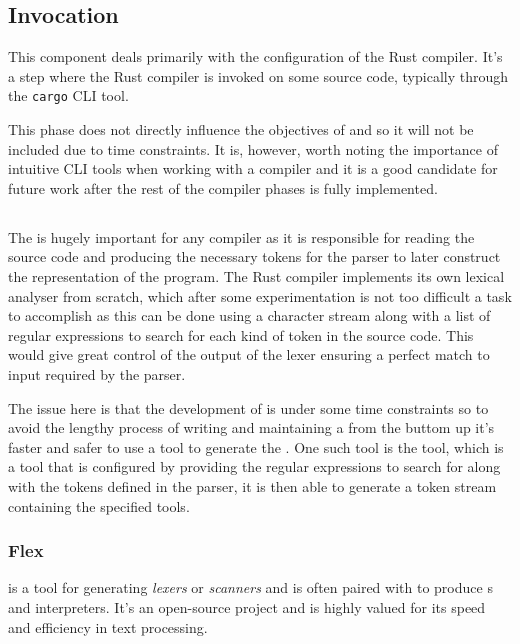 \subsection{Invocation}

This component deals primarily with the configuration of the Rust compiler. It's a
step where the Rust compiler is invoked on some source code, typically through the
\texttt{cargo} CLI tool\cite{RUST_COMPILER}. 

This phase does not directly influence the objectives of \lang{} and so it will not
be included due to time constraints. It is, however, worth noting the importance of
intuitive CLI tools when working with a compiler and it is a good candidate for
future work after the rest of the compiler phases is fully implemented.

\subsection{\lexer{}}

The \lexer{} is hugely important for any compiler as it is responsible for
reading the source code and producing the necessary tokens for the parser to later
construct the \ast{} representation of the program. The Rust compiler implements its
own lexical analyser from scratch, which after some experimentation is not too
difficult a task to accomplish as this can be done using a character stream along
with a list of regular expressions to search for each kind of token in the source
code. This would give great control of the output of the lexer ensuring a perfect
match to input required by the parser. 

The issue here is that the development of \lang{} is under some time constraints so
to avoid the lengthy process of writing and maintaining a \lexer{} from the buttom up
it's faster and safer to use a tool to generate the \lexer{}. One such tool is the
\lexerGen{} tool, which is a tool that is configured by providing the regular
expressions to search for along with the tokens defined in the parser, it is then
able to generate a token stream containing the specified tools. 

\subsubsection{Flex}

\lexerGen{} is a tool for generating \textit{lexers} or \textit{scanners} and is
often paired with \parserGen{} to produce \parser{}s and interpreters. It's an
open-source project and is highly valued for its speed and efficiency in text
processing. \\

